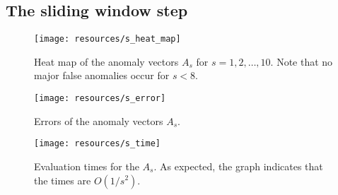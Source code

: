 \subsection{The sliding window step}
\FloatBarrier
\label{sect:s}

\begin{figure}[h]
    \vspace{-15pt}
    \begin{center}
        \texttt{[image: resources/s\_heat\_map]}
    \end{center}
    \vspace{-20pt}
    \caption{\small{Heat map of the anomaly vectors $A_s$ for $s = 1,2,\dots,10$. Note that no major false anomalies occur for $s < 8$.}}
    \vspace{-10pt}
    \label{fig:s_heat_map}
\end{figure}


\begin{figure}[h]
    \begin{minipage}{0.5\textwidth}
        \centering
        \texttt{[image: resources/s\_error]}
        \caption{\small{Errors of the anomaly vectors $A_s$.\\ \quad}}
    \label{fig:s_error}
    \end{minipage}%
    \begin{minipage}{0.5\textwidth}
        \centering
        \texttt{[image: resources/s\_time]}
        \caption{\small{Evaluation times for the $A_s$. As expected, the graph indicates that the times are $O(1/s^2)$.}}
        \label{fig:s_time}
    \end{minipage}%
\end{figure}%


